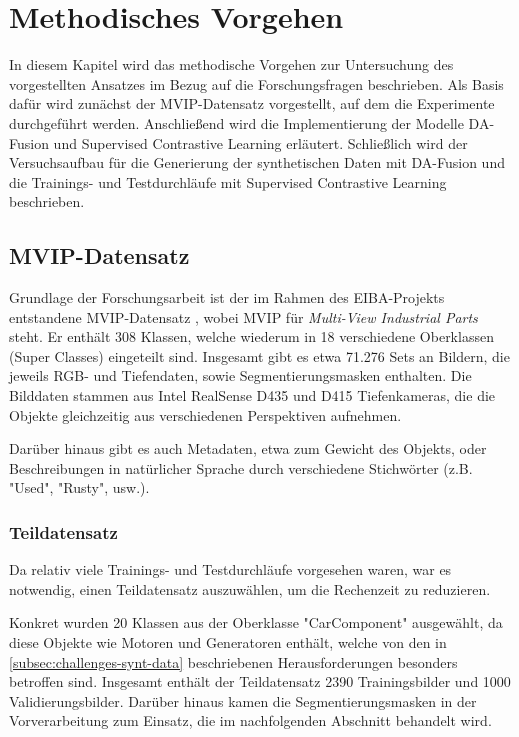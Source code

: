 \chapter{Methodisches Vorgehen} \label{ch:methodology}

In diesem Kapitel wird das methodische Vorgehen zur Untersuchung des vorgestellten Ansatzes im Bezug auf die Forschungsfragen beschrieben. Als Basis dafür wird zunächst der MVIP-Datensatz vorgestellt, auf dem die Experimente durchgeführt werden. Anschließend wird die Implementierung der Modelle DA-Fusion und Supervised Contrastive Learning erläutert. Schließlich wird der Versuchsaufbau für die Generierung der synthetischen Daten mit DA-Fusion und die Trainings- und Testdurchläufe mit Supervised Contrastive Learning beschrieben.

\section{MVIP-Datensatz} \label{sec:dataset}

Grundlage der Forschungsarbeit ist der im Rahmen des EIBA-Projekts entstandene MVIP-Datensatz \parencite{Koch2023mvip}, wobei MVIP für \textit{Multi-View Industrial Parts} steht. Er enthält 308 Klassen, welche wiederum in 18 verschiedene Oberklassen (Super Classes) eingeteilt sind. Insgesamt gibt es etwa 71.276 Sets an Bildern, die jeweils RGB- und Tiefendaten, sowie Segmentierungsmasken enthalten. Die Bilddaten stammen aus Intel RealSense D435 und D415 Tiefenkameras, die die Objekte gleichzeitig aus verschiedenen Perspektiven aufnehmen.

Darüber hinaus gibt es auch Metadaten, etwa zum Gewicht des Objekts, oder Beschreibungen in natürlicher Sprache durch verschiedene Stichwörter (z.B. "Used", "Rusty", usw.).

\subsection{Teildatensatz} \label{subsec:subdataset}

Da relativ viele Trainings- und Testdurchläufe vorgesehen waren, war es notwendig, einen Teildatensatz auszuwählen, um die Rechenzeit zu reduzieren.

Konkret wurden 20 Klassen aus der Oberklasse "CarComponent" ausgewählt, da diese Objekte wie Motoren und Generatoren enthält, welche von den in \autoref{subsec:challenges-synt-data} beschriebenen Herausforderungen besonders betroffen sind. Insgesamt enthält der Teildatensatz 2390 Trainingsbilder und 1000 Validierungsbilder. Darüber hinaus kamen die Segmentierungsmasken in der Vorverarbeitung zum Einsatz, die im nachfolgenden Abschnitt behandelt wird. %

